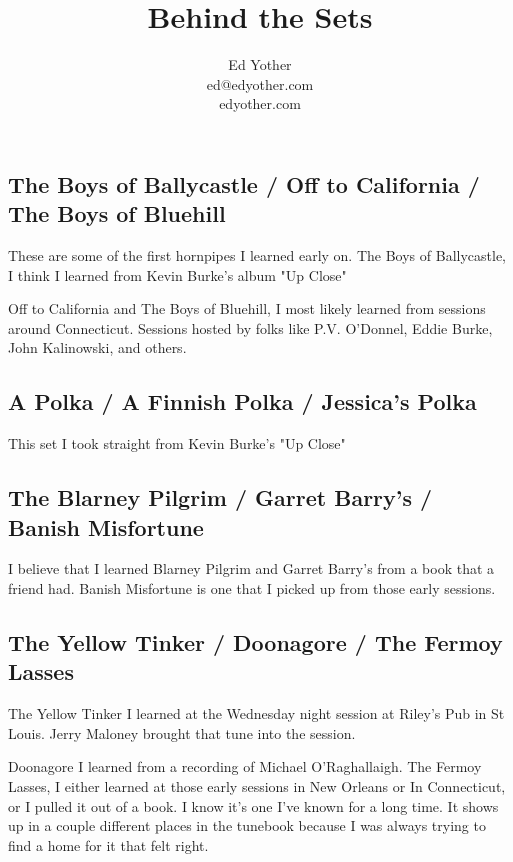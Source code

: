 \documentclass[11pt,letterpaper]{article}
\begin{document}
\title{Behind the Sets}
\author{Ed Yother\\ed@edyother.com\\edyother.com}

\maketitle
\subsection*{The Boys of Ballycastle / Off to California / The Boys of Bluehill}

These are some of the first hornpipes I learned early on. The Boys of Ballycastle, I think I learned from Kevin Burke's album "Up Close"

Off to California and The Boys of Bluehill, I most likely learned from sessions around Connecticut. Sessions hosted by folks like P.V. O'Donnel, Eddie Burke, John Kalinowski, and others.

\subsection*{A Polka / A Finnish Polka / Jessica's Polka}

This set I took straight from Kevin Burke's "Up Close"

\subsection*{The Blarney Pilgrim / Garret Barry's / Banish Misfortune}

I believe that I learned Blarney Pilgrim and Garret Barry's from a book that a friend had. Banish Misfortune is one that I picked up from those early sessions.

\subsection*{The Yellow Tinker / Doonagore / The Fermoy Lasses}

The Yellow Tinker I learned at the Wednesday night session at Riley's Pub in St Louis. Jerry Maloney brought that tune into the session.

Doonagore I learned from a recording of Michael O'Raghallaigh. The Fermoy Lasses, I either learned at those early sessions in New Orleans or In Connecticut, or I pulled it out of a book. I know it's one I've known for a long time. It shows up in a couple different places in the tunebook because I was always trying to find a home for it that felt right. 
\end{document}
